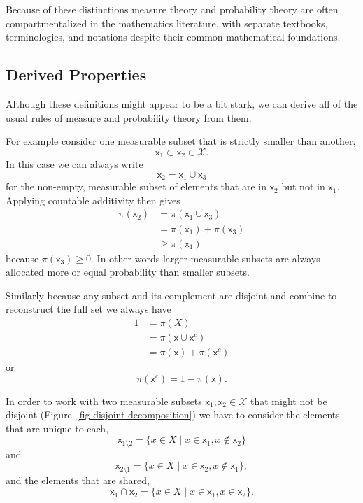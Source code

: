 \documentclass[
  letterpaper,
  DIV=11,
  numbers=noendperiod]{scrartcl}
\begin{document}
Because of these distinctions measure theory and probability theory are
often compartmentalized in the mathematics literature, with separate
textbooks, terminologies, and notations despite their common
mathematical foundations.

\hypertarget{derived-properties}{%
\subsection{Derived Properties}\label{derived-properties}}

Although these definitions might appear to be a bit stark, we can derive
all of the usual rules of measure and probability theory from them.

For example consider one measurable subset that is strictly smaller than
another, \[
\mathsf{x}_{1} \subset \mathsf{x}_{2} \in \mathcal{X}.
\] In this case we can always write \[
\mathsf{x}_{2} = \mathsf{x}_{1} \cup \mathsf{x}_{3}
\] for the non-empty, measurable subset of elements that are in
\(\mathsf{x}_{2}\) but not in \(\mathsf{x}_{1}\). Applying countable
additivity then gives \begin{align*}
\pi(\mathsf{x}_{2})
&= \pi(\mathsf{x}_{1} \cup \mathsf{x}_{3})
\\
&= \pi(\mathsf{x}_{1}) + \pi(\mathsf{x}_{3})
\\
&\ge \pi(\mathsf{x}_{1})
\end{align*} because \(\pi(\mathsf{x}_{3}) \ge 0\). In other words
larger measurable subsets are always allocated more or equal probability
than smaller subsets.

Similarly because any subset and its complement are disjoint and combine
to reconstruct the full set we always have \begin{align*}
1
&= \pi(X)
\\
&= \pi(\mathsf{x} \cup \mathsf{x}^{c})
\\
&= \pi(\mathsf{x}) + \pi(\mathsf{x}^{c})
\end{align*} or \[
\pi(\mathsf{x}^{c}) = 1 - \pi(\mathsf{x}).
\]

In order to work with two measurable subsets
\(\mathsf{x}_{1}, \mathsf{x}_{2} \in \mathcal{X}\) that might not be
disjoint (Figure~\ref{fig-disjoint-decomposition}) we have to consider
the elements that are unique to each, \[
\mathsf{x}_{1 \setminus 2}
=
\{ x \in X \mid x \in \mathsf{x}_{1}, x \notin \mathsf{x}_{2} \}
\] and \[
\mathsf{x}_{2 \setminus 1}
=
\{ x \in X \mid x \in \mathsf{x}_{2}, x \notin \mathsf{x}_{1} \},
\] and the elements that are shared, \[
\mathsf{x}_{1} \cap \mathsf{x}_{2}
=
\{ x \in X \mid x \in \mathsf{x}_{1}, x \in \mathsf{x}_{2} \}.
\]
\end{document}
